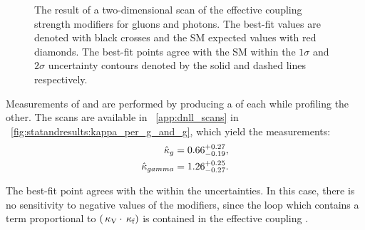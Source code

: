 \begin{figure}[ht!]
\centering
\caption{The result of a two-dimensional \DNLL scan of the effective coupling strength modifiers for gluons and photons. The best-fit values are denoted with black crosses and the SM expected values with red diamonds. The best-fit points agree with the SM within the $1\sigma$ and $2\sigma$ uncertainty contours denoted by the solid and dashed lines respectively.}
\label{fig:statandresults:kappa_plots_kgkp}
\end{figure}
Measurements of \kGlu and \kPho are performed by producing a \DNLL of each \POI while profiling the other.
The scans are available in \App~\ref{app:dnll_scans} in \Fig~\ref{fig:statandresults:kappa_per_g_and_g}, which yield the measurements:
\begin{equation*}
\begin{split}
\hat{\kappa}_{g} = 0.66^{+0.27}_{-0.19}, \\
\hat{\kappa}_{gamma} = 1.26^{+0.25}_{-0.27}.
\end{split}
\end{equation*}

The best-fit point agrees with the \SM within the uncertainties. In this case, there is no sensitivity to negative values of the modifiers, since the \Hgg loop which contains a term proportional to $(\,\kappa_\text{V}\cdot\,\kappa_\text{f})$ is contained in the effective coupling \kPho. 



